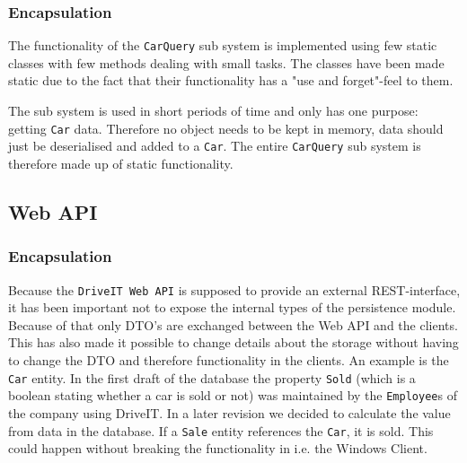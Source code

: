 \subsubsection{Encapsulation}
The functionality of the \texttt{CarQuery} sub system is implemented using few static classes with few methods dealing with small tasks. The classes have been made static due to the fact that their functionality has a "use and forget"-feel to them. 

The sub system is used in short periods of time and only has one purpose: getting \texttt{Car} data. Therefore no object needs to be kept in memory, data should just be deserialised and added to a \texttt{Car}. The entire \texttt{CarQuery} sub system is therefore made up of static functionality.

\subsection{Web API}
\subsubsection{Encapsulation}
Because the \texttt{DriveIT Web API} is supposed to provide an external REST-interface, it has been important not to expose the internal types of the persistence module. Because of that only DTO's are exchanged between the Web API and the clients.\\

This has also made it possible to change details about the storage without having to change the DTO and therefore functionality in the clients. An example is the \texttt{Car} entity. In the first draft of the database the property \texttt{Sold} (which is a boolean stating whether a car is sold or not) was maintained by the \texttt{Employee}s of the company using DriveIT. In a later revision we decided to calculate the value from data in the database. If a \texttt{Sale} entity references the \texttt{Car}, it is sold. This could happen without breaking the functionality in i.e. the Windows Client.